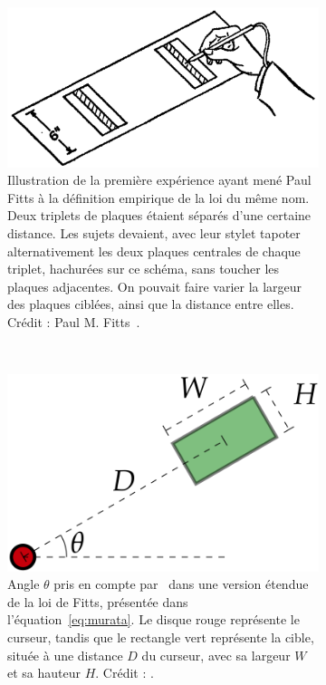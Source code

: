 	\begin{figure}[!htb]
		\begin{subfigure}[t]{0.58\textwidth}
			\centering
			\includegraphics[width=\textwidth]{figures/ch2/fitts}
			\caption{Illustration de la première expérience ayant mené Paul Fitts à la  définition empirique  de la loi du même nom. Deux triplets de plaques étaient séparés d'une certaine distance. Les sujets devaient, avec leur stylet \og tapoter \fg{} alternativement les deux plaques centrales de chaque triplet, hachurées sur ce schéma, sans toucher les plaques adjacentes. On pouvait faire varier la largeur des plaques ciblées, ainsi que la distance entre elles. Crédit : Paul M. Fitts~\cite{fitts1954information}.}
			\label{fig:fitts}
		\end{subfigure}
		~
		\begin{subfigure}[t]{0.40\textwidth}
			\centering
			\includegraphics[width=\textwidth]{figures/ch2/theta}
			\caption{Angle $\theta$ pris en compte par~\cite{murata2001extending} dans une version étendue de la loi de Fitts, présentée dans l'équation~\ref{eq:murata}. Le disque rouge représente le curseur, tandis que le rectangle vert représente la cible, située à une distance $D$ du curseur, avec sa largeur $W$ et sa hauteur $H$. Crédit : \cite{casallas2015prediction}.}
			\label{fig:theta}
		\end{subfigure}
		\caption{}
		\label{fig:fittstheta}
	\end{figure}
	
